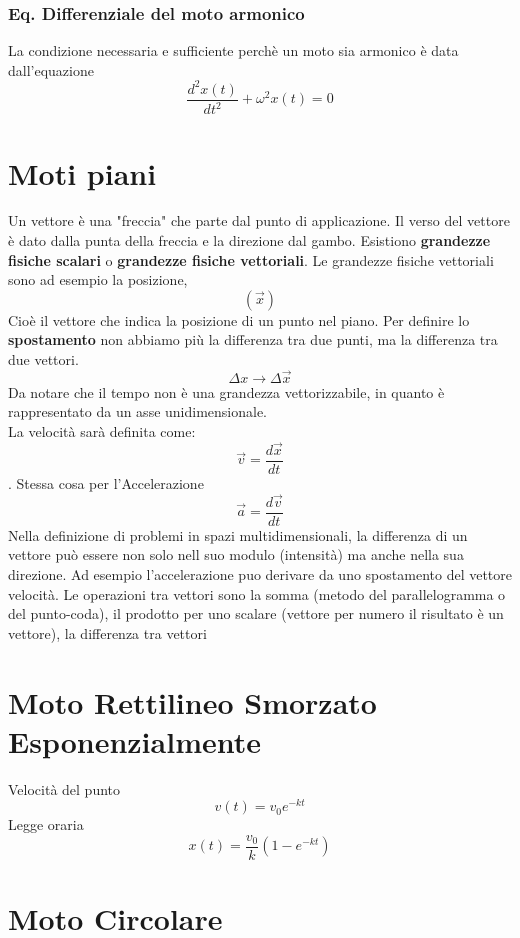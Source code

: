 \documentclass[a4paper]{report}
\begin{document}
  \subsubsection{Eq. Differenziale del moto armonico}
  La condizione necessaria e sufficiente perchè un moto sia armonico è data dall'equazione
  $$ \frac{d^2 x(t)}{dt^2} + \omega^2 x(t) = 0 $$

  \section{Moti piani}
  Un vettore è una "freccia" che parte dal punto di applicazione. Il verso del vettore è dato dalla punta della freccia e la direzione dal gambo.
  Esistiono \textbf{grandezze fisiche scalari} o \textbf{grandezze fisiche vettoriali}.
  Le grandezze fisiche vettoriali sono ad esempio la posizione,
  $$ (\vec{x})$$
  Cioè il vettore che indica la posizione di un punto nel piano.
  Per definire lo \textbf{spostamento} non abbiamo più la differenza tra due punti, ma la differenza tra due vettori.
  $$\Delta x \rightarrow \Delta \vec{x}$$
  Da notare che il tempo non è una grandezza vettorizzabile, in quanto è rappresentato da un asse unidimensionale.\\
  La velocità sarà definita come:
  $$\vec{v} = \frac{d\vec{x}}{dt}$$.
  Stessa cosa per l'Accelerazione
  $$\vec{a} = \frac{d\vec{v}}{dt}$$
  Nella definizione di problemi in spazi multidimensionali, la differenza di un vettore può essere non solo nell suo modulo (intensità) ma anche nella sua direzione. Ad esempio l'accelerazione puo derivare da uno spostamento del vettore velocità.
  Le operazioni tra vettori sono la somma (metodo del parallelogramma o del punto-coda), il prodotto per uno scalare (vettore per numero il risultato è un vettore), la differenza tra vettori


  \section{Moto Rettilineo Smorzato Esponenzialmente}
  Velocità del punto
  $$ v(t) = v_0 e^{-kt} $$
  Legge oraria
  $$ x(t) = \frac{v_0}{k} (1-e^{-kt}) $$


  \section{Moto Circolare}
\end{document}
